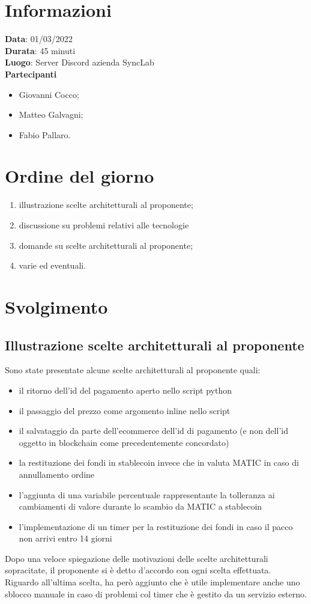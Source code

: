 \documentclass[a4paper, 12pt]{article}
\begin{document}
\makefrontpage

\section{Informazioni}
\textbf{Data}: 01/03/2022\\
\textbf{Durata}: 45 minuti\\
\textbf{Luogo}: Server Discord azienda SyncLab\\

\textbf{Partecipanti}
\begin{itemize}
	\item Giovanni Cocco;
	\item Matteo Galvagni;
	\item Fabio Pallaro.
\end{itemize}


\section{Ordine del giorno}
\begin{enumerate}
	\item illustrazione scelte architetturali al proponente;
	\item discussione su problemi relativi alle tecnologie
	\item domande su scelte architetturali al proponente;
	\item varie ed eventuali.
\end{enumerate}

\section{Svolgimento}
\subsection{Illustrazione scelte architetturali al proponente}
Sono state presentate alcune scelte architetturali al proponente quali:
\begin{itemize}
	\item il ritorno dell'id del pagamento aperto nello script python
	\item il passaggio del prezzo come argomento inline nello script
	\item il salvataggio da parte dell'ecommerce dell'id di pagamento (e non dell'id oggetto in blockchain come precedentemente concordato)
	\item la restituzione dei fondi in stablecoin invece che in valuta MATIC in caso di annullamento ordine
	\item l'aggiunta di una variabile percentuale rappresentante la tolleranza ai cambiamenti di valore durante lo scambio da MATIC a stablecoin
	\item l'implementazione di un timer per la restituzione dei fondi in caso il pacco non arrivi entro 14 giorni
\end{itemize}
Dopo una veloce spiegazione delle motivazioni delle scelte architetturali sopracitate, il proponente si è detto d'accordo con ogni scelta effettuata.
Riguardo all'ultima scelta, ha però aggiunto che è utile implementare anche uno sblocco manuale in caso di problemi col timer che è gestito da un servizio esterno.
\end{document}
